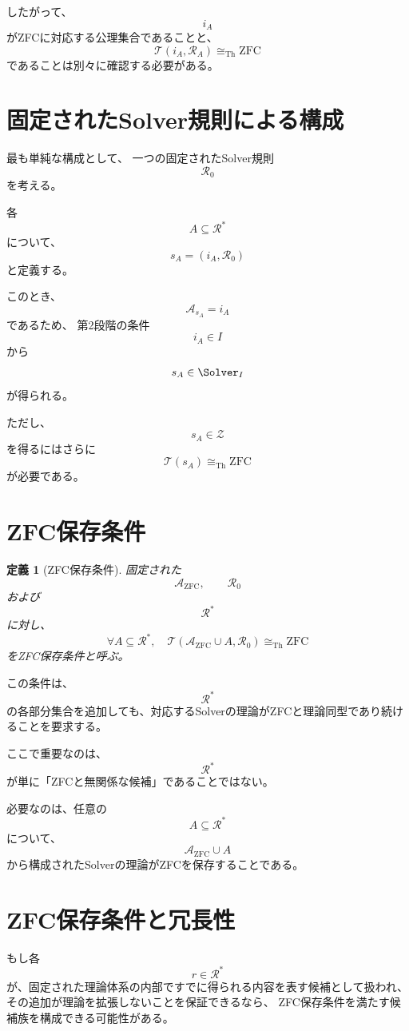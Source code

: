 \documentclass[11pt,a4paper]{article}
\newtheorem{definition}{定義}
\begin{document}
したがって、
\[
i_A
\]
がZFCに対応する公理集合であることと、
\[
\mathcal T(i_A,\mathcal R_A)
\cong_{\mathrm{Th}}\mathrm{ZFC}
\]
であることは別々に確認する必要がある。

\section{固定されたSolver規則による構成}

最も単純な構成として、
一つの固定されたSolver規則
\[
\mathcal R_0
\]
を考える。

各
\[
A\subseteq\mathcal R^*
\]
について、
\[
\boxed{
s_A=(i_A,\mathcal R_0)
}
\]
と定義する。

このとき、
\[
\mathcal A_{s_A}=i_A
\]
であるため、
第2段階の条件
\[
i_A\in I
\]
から
\[
s_A\in\Solver_I
\]
が得られる。

ただし、
\[
s_A\in\mathcal Z
\]
を得るにはさらに
\[
\mathcal T(s_A)\cong_{\mathrm{Th}}\mathrm{ZFC}
\]
が必要である。

\section{ZFC保存条件}

\begin{definition}[ZFC保存条件]
固定された
\[
\mathcal A_{\mathrm{ZFC}},
\qquad
\mathcal R_0
\]
および
\[
\mathcal R^*
\]
に対し、
\[
\boxed{
\forall A\subseteq\mathcal R^*,
\quad
\mathcal T(\mathcal A_{\mathrm{ZFC}}\cup A,\mathcal R_0)
\cong_{\mathrm{Th}}\mathrm{ZFC}
}
\]
をZFC保存条件と呼ぶ。
\end{definition}

この条件は、
\[
\mathcal R^*
\]
の各部分集合を追加しても、対応するSolverの理論がZFCと理論同型であり続けることを要求する。

ここで重要なのは、
\[
\mathcal R^*
\]
が単に「ZFCと無関係な候補」であることではない。

必要なのは、任意の
\[
A\subseteq\mathcal R^*
\]
について、
\[
\mathcal A_{\mathrm{ZFC}}\cup A
\]
から構成されたSolverの理論がZFCを保存することである。

\section{ZFC保存条件と冗長性}

もし各
\[
r\in\mathcal R^*
\]
が、固定された理論体系の内部ですでに得られる内容を表す候補として扱われ、
その追加が理論を拡張しないことを保証できるなら、
ZFC保存条件を満たす候補族を構成できる可能性がある。
\end{document}
